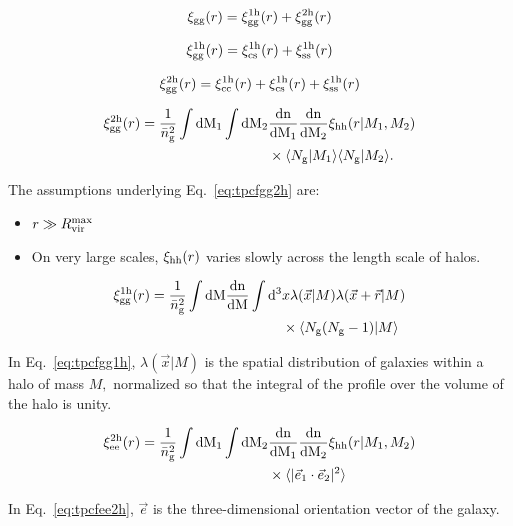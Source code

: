\documentclass[fleqn,usenatbib]{mnras}
\newcommand{\beq}{\begin{eqnarray}}
\newcommand{\eeq}{\end{eqnarray}}
\newcommand{\bit}{\begin{itemize}}
\newcommand{\eit}{\end{itemize}}
\newcommand{\tpcf}[1]{\xi_{\rm #1}}
\newcommand{\tpcftwo}[2]{\xi_{\rm #1}^{\rm #2}}
\newcommand{\evec}[1]{\vec{e}_{\rm #1}}
\newcommand{\dd}{\rm d}
\newcommand{\mean}[1]{\langle #1 \rangle}
\newcommand{\meantwo}[2]{\langle #1 \vert #2 \rangle}
\begin{document}
\beq
\tpcf{gg}(r) = \tpcftwo{gg}{1h}(r) + \tpcftwo{gg}{2h}(r)
\eeq

\beq
\tpcftwo{gg}{1h}(r) = \tpcftwo{cs}{1h}(r) + \tpcftwo{ss}{1h}(r) 
\eeq

\beq
\tpcftwo{gg}{2h}(r) =  \tpcftwo{cc}{1h}(r) + \tpcftwo{cs}{1h}(r) + \tpcftwo{ss}{1h}(r) 
\eeq

\begin{align}
\label{eq:tpcfgg2h}
\begin{split}
\tpcftwo{gg}{2h}(r) =   \frac{1}{\bar{n}_{\rm g}^{2}}\int\dd M_1 \int\dd M_2 & \frac{\rm dn}{\dd M_1}\frac{\rm dn}{\dd M_2} \tpcf{hh}(r\vert M_1, M_2) \\& \times  \meantwo{N_{\rm g}}{M_1} \meantwo{N_{\rm g}}{M_2}. 
\end{split}
\end{align}

The assumptions underlying Eq.~\ref{eq:tpcfgg2h} are:
\bit
\item $r\gg R_{\rm vir}^{\rm max}$
\item On very large scales, $\tpcf{hh}(r)$ varies slowly across the length scale of halos. 
\eit

\begin{align}
\label{eq:tpcfgg1h}
\begin{split}
\tpcftwo{gg}{1h}(r) =  \frac{1}{\bar{n}_{\rm g}^{2}} \int\dd M \frac{\rm dn}{\dd M} \int\dd^{3}& x\lambda(\vec{x}\vert M)\lambda(\vec{x}+\vec{r}\vert M)\\ & \times  \meantwo{N_{\rm g}(N_{\rm g}-1)}{M}
\end{split}
\end{align}

In Eq.~\ref{eq:tpcfgg1h}, $\lambda(\vec{x}\vert M)$ is the spatial distribution of galaxies within a halo of mass $M,$ normalized so that the integral of the profile over the volume of the halo is unity.

\begin{align}
\label{eq:tpcfee2h}
\begin{split}
\tpcftwo{ee}{2h}(r) =   \frac{1}{\bar{n}_{\rm g}^{2}}\int\dd M_1 \int\dd M_2 & \frac{\rm dn}{\dd M_1}\frac{\rm dn}{\dd M_2} \tpcf{hh}(r\vert M_1, M_2) \\& \times  \mean{\vert\evec{1}\cdot\evec{2}\vert^{2}}
\end{split}
\end{align}

In Eq.~\ref{eq:tpcfee2h}, $\vec{e}$ is the three-dimensional orientation vector of the galaxy. 
\end{document}
